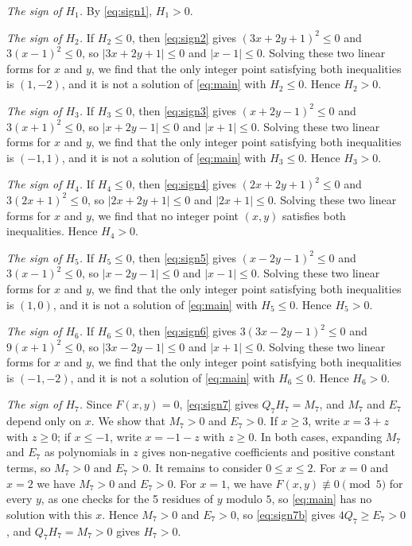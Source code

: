 \documentclass[11pt]{article}
\begin{document}
\emph{The sign of $H_{1}$.} By \eqref{eq:sign1}, $H_{1}>0$.

\emph{The sign of $H_{2}$.} If $H_{2}\leq0$, then \eqref{eq:sign2} gives $(3x+2y+1)^2\leq 0$ and $3(x-1)^2\leq 0$, so $|3x+2y+1|\leq0$ and $|x-1|\leq0$. Solving these two linear forms for $x$ and $y$, we find that the only integer point satisfying both inequalities is $(1,-2)$, and it is not a solution of \eqref{eq:main} with $H_{2}\leq0$. Hence $H_{2}>0$.

\emph{The sign of $H_{3}$.} If $H_{3}\leq0$, then \eqref{eq:sign3} gives $(x+2y-1)^2\leq 0$ and $3(x+1)^2\leq 0$, so $|x+2y-1|\leq0$ and $|x+1|\leq0$. Solving these two linear forms for $x$ and $y$, we find that the only integer point satisfying both inequalities is $(-1,1)$, and it is not a solution of \eqref{eq:main} with $H_{3}\leq0$. Hence $H_{3}>0$.

\emph{The sign of $H_{4}$.} If $H_{4}\leq0$, then \eqref{eq:sign4} gives $(2x+2y+1)^2\leq 0$ and $3(2x+1)^2\leq 0$, so $|2x+2y+1|\leq0$ and $|2x+1|\leq0$. Solving these two linear forms for $x$ and $y$, we find that no integer point $(x,y)$ satisfies both inequalities. Hence $H_{4}>0$.

\emph{The sign of $H_{5}$.} If $H_{5}\leq0$, then \eqref{eq:sign5} gives $(x-2y-1)^2\leq 0$ and $3(x-1)^2\leq 0$, so $|x-2y-1|\leq0$ and $|x-1|\leq0$. Solving these two linear forms for $x$ and $y$, we find that the only integer point satisfying both inequalities is $(1,0)$, and it is not a solution of \eqref{eq:main} with $H_{5}\leq0$. Hence $H_{5}>0$.

\emph{The sign of $H_{6}$.} If $H_{6}\leq0$, then \eqref{eq:sign6} gives $3(3x-2y-1)^2\leq 0$ and $9(x+1)^2\leq 0$, so $|3x-2y-1|\leq0$ and $|x+1|\leq0$. Solving these two linear forms for $x$ and $y$, we find that the only integer point satisfying both inequalities is $(-1,-2)$, and it is not a solution of \eqref{eq:main} with $H_{6}\leq0$. Hence $H_{6}>0$.

\emph{The sign of $H_{7}$.} Since $F(x,y)=0$, \eqref{eq:sign7} gives $Q_{7}H_{7}=M_{7}$, and $M_{7}$ and $E_{7}$ depend only on $x$. We show that $M_{7}>0$ and $E_{7}>0$. If $x\geq3$, write $x=3+z$ with $z\geq0$; if $x\leq-1$, write $x=-1-z$ with $z\geq0$. In both cases, expanding $M_{7}$ and $E_{7}$ as polynomials in $z$ gives non-negative coefficients and positive constant terms, so $M_{7}>0$ and $E_{7}>0$. It remains to consider $0\leq x\leq2$. For $x=0$ and $x=2$ we have $M_{7}>0$ and $E_{7}>0$. For $x=1$, we have $F(x,y)\not\equiv0\pmod{5}$ for every $y$, as one checks for the 5 residues of $y$ modulo $5$, so \eqref{eq:main} has no solution with this $x$. Hence $M_{7}>0$ and $E_{7}>0$, so \eqref{eq:sign7b} gives $4Q_{7}\geq E_{7}>0$, and $Q_{7}H_{7}=M_{7}>0$ gives $H_{7}>0$.
\end{document}

